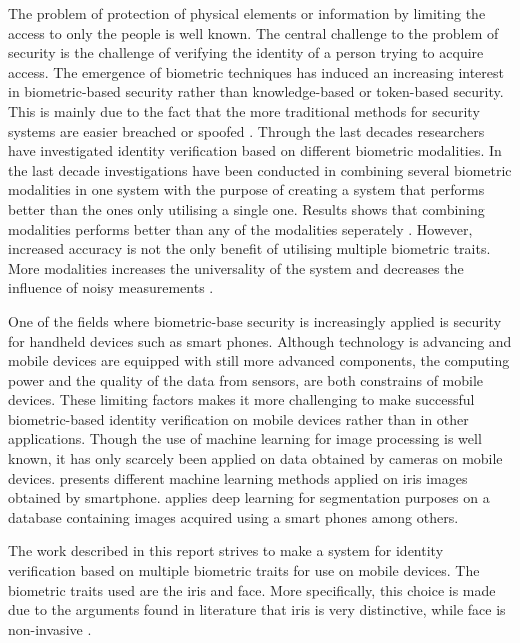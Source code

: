 The problem of protection of physical elements or information by limiting the access to only the people  is well known. The central challenge to the problem of security is the challenge of verifying the identity of a person trying to acquire access. The emergence of biometric techniques has induced an increasing interest in biometric-based security rather than knowledge-based or token-based security. This is mainly due to the fact  that the more traditional methods for security systems are easier breached or spoofed \citep{Ross2003}. Through the last decades researchers have investigated identity verification based on different biometric modalities. In the last decade investigations have been conducted in combining several biometric modalities in one system with the purpose of creating a system that performs better than the ones only utilising a single one. Results shows that combining modalities performs better than any of the modalities seperately \citep{Chen2005a}.  However, increased accuracy is not the only benefit of utilising multiple biometric traits. More modalities increases the universality of the system and decreases the influence of noisy measurements \citep{Ross2003}.

One of the fields where biometric-base security is increasingly applied is security for handheld devices such as smart phones. Although technology is advancing and mobile devices are equipped with still more advanced components, the computing power and the quality of the data from sensors, are both constrains of mobile devices. These limiting factors makes it more challenging to make successful biometric-based identity verification on mobile devices rather than in other applications. Though the use of machine learning for image processing is well known, it has only scarcely been applied on data obtained by cameras on mobile devices. \cite{Khan2017a} presents different machine learning methods applied on iris images obtained by smartphone. \cite{Bazrafkan2017} applies deep learning for segmentation purposes on a database containing images acquired using a smart phones among others. 
 
The work described in this report strives to make a system for identity verification based on multiple biometric traits for use on mobile devices. The biometric traits used are the iris and face. More specifically, this choice is made due to the arguments found in literature that iris is very distinctive, while face is non-invasive \citep{Wang2009a}. 